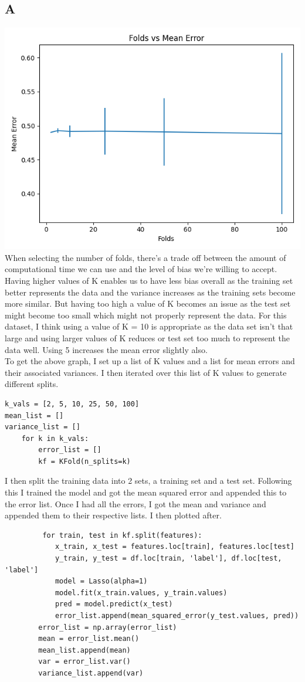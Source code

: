 \documentclass[11pt]{article} %
\begin{document}
\subsection{A}
\includegraphics[scale=0.4]{fold.jpg}
\\
When selecting the number of folds, there's a trade off between the amount of computational time we can use and the level of bias we're willing to accept. Having higher values of K enables us to have less bias overall as the training set better represents the data and the variance increases as the training sets become more similar. But having too high a value of K becomes an issue as the test set might become too small which might not properly represent the data. For this dataset, I think using a value of K = 10 is appropriate as the data set isn't that large and using larger values of K reduces or test set too much to represent the data well. Using 5 increases the mean error slightly also.
\\ To get the above graph, I set up a list of K values and a list for mean errors and their associated variances.  I then iterated over this list of K values to generate different splits.
\begin{verbatim}
k_vals = [2, 5, 10, 25, 50, 100]
mean_list = []
variance_list = []
    for k in k_vals:
        error_list = []
        kf = KFold(n_splits=k)
\end{verbatim}
I then split the training data into 2 sets, a training set and a test set. Following this I trained the model and got the mean squared error and appended this to the error list. Once I had all the errors, I got the mean and variance and appended them to their respective lists. I then plotted after.
 \begin{verbatim}
         for train, test in kf.split(features):
            x_train, x_test = features.loc[train], features.loc[test]
            y_train, y_test = df.loc[train, 'label'], df.loc[test, 'label']
            model = Lasso(alpha=1)
            model.fit(x_train.values, y_train.values)
            pred = model.predict(x_test)
            error_list.append(mean_squared_error(y_test.values, pred))
        error_list = np.array(error_list)
        mean = error_list.mean()
        mean_list.append(mean)
        var = error_list.var()
        variance_list.append(var)
 \end{verbatim}
\end{document}

